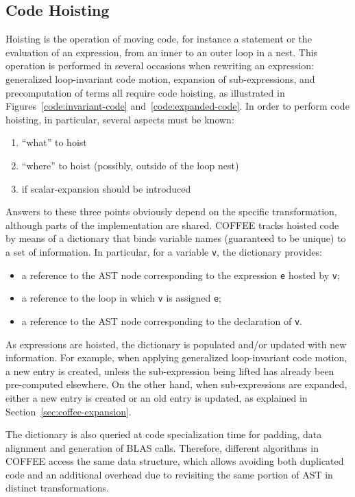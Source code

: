 \subsection{Code Hoisting}
Hoisting is the operation of moving code, for instance a statement or the evaluation of an expression, from an inner to an outer loop in a nest. This operation is performed in several occasions when rewriting an expression: generalized loop-invariant code motion, expansion of sub-expressions, and precomputation of terms all require code hoisting, as illustrated in Figures~\ref{code:invariant-code} and~\ref{code:expanded-code}. In order to perform code hoisting, in particular, several aspects must be known:
\begin{enumerate}
\item ``what'' to hoist
\item ``where'' to hoist (possibly, outside of the loop nest)
\item if scalar-expansion should be introduced
\end{enumerate}
Answers to these three points obviously depend on the specific transformation, although parts of the implementation are shared. COFFEE tracks hoisted code by means of a dictionary that binds variable names (guaranteed to be unique) to a set of information. In particular, for a variable \texttt{v}, the dictionary provides:
\begin{itemize}
\item a reference to the AST node corresponding to the expression \texttt{e} hosted by \texttt{v};
\item a reference to the loop in which \texttt{v} is assigned \texttt{e};
\item a reference to the AST node corresponding to the declaration of \texttt{v}.
\end{itemize}
As expressions are hoisted, the dictionary is populated and/or updated with new information. For example, when applying generalized loop-invariant code motion, a new entry is created, unless the sub-expression being lifted has already been pre-computed elsewhere. On the other hand, when sub-expressions are expanded, either a new entry is created or an old entry is updated, as explained in Section~\ref{sec:coffee-expansion}. 

The dictionary is also queried at code specialization time for padding, data alignment and generation of BLAS calls. Therefore, different algorithms in COFFEE access the same data structure, which allows avoiding both duplicated code and an additional overhead due to revisiting the same portion of AST in distinct transformations.

